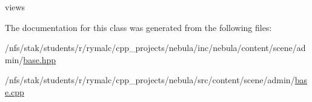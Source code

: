 views 

The documentation for this class was generated from the following files:\begin{DoxyCompactItemize}
\item 
/nfs/stak/students/r/rymalc/cpp\_\-projects/nebula/inc/nebula/content/scene/admin/\hyperlink{inc_2nebula_2content_2scene_2admin_2base_8hpp}{base.hpp}\item 
/nfs/stak/students/r/rymalc/cpp\_\-projects/nebula/src/content/scene/admin/\hyperlink{src_2content_2scene_2admin_2base_8cpp}{base.cpp}\end{DoxyCompactItemize}
